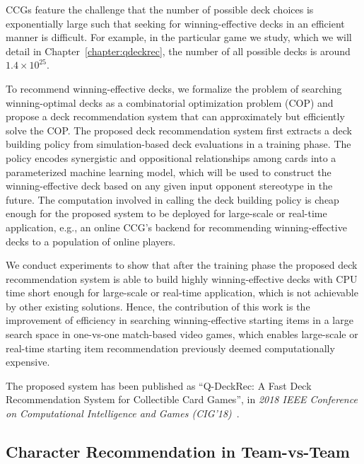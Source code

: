 CCGs feature the challenge that the number of possible deck choices is exponentially large such that seeking for winning-effective decks in an efficient manner is difficult. For example, in the particular game we study, which we will detail in Chapter~\ref{chapter:qdeckrec}, the number of all possible decks is around $1.4 \times 10^{25}$. 

To recommend winning-effective decks, we formalize the problem of searching winning-optimal decks as a combinatorial optimization problem (COP) and propose a deck recommendation system that can approximately but efficiently solve the COP. The proposed deck recommendation system first extracts a deck building policy from simulation-based deck evaluations in a training phase. The policy encodes synergistic and oppositional relationships among cards into a parameterized machine learning model, which will be used to construct the winning-effective deck based on any given input opponent stereotype in the future. The computation involved in calling the deck building policy is cheap enough for the proposed system to be deployed for large-scale or real-time application, e.g., an online CCG's backend for recommending winning-effective decks to a population of online players. 

We conduct experiments to show that after the training phase the proposed deck recommendation system is able to build highly winning-effective decks with CPU time short enough for large-scale or real-time application, which is not achievable by other existing solutions. Hence, the contribution of this work is the improvement of efficiency in searching winning-effective starting items in a large search space in one-vs-one match-based video games, which enables large-scale or real-time starting item recommendation previously deemed computationally expensive.

The proposed system has been published as ``Q-DeckRec: A Fast Deck Recommendation System for Collectible Card Games'', in \textit{2018 IEEE Conference on Computational Intelligence and Games (CIG'18)}~\cite{chenqdeckrec}.

\subsection{Character Recommendation in Team-vs-Team}\label{sec:thesis_overview:character_recom}

